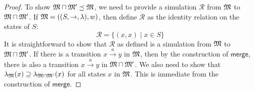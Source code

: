 \begin{proof}
To show $\frak{M} \sqcap \frak{M}' \preceq \frak{M}$, we need to provide a simulation $\mathcal{R}$ from $\frak{M}$ to  $\frak{M} \sqcap \frak{M}'$.
If $\frak{M} = ((S,\rightarrow,\lambda),w)$, then define $\mathcal{R}$ as the identity relation on the states of $S$:
\[
\mathcal{R} = \{(x,x) \; | \; x \in S\}
\]
It is straightforward to show that $\mathcal{R}$ as defined is a simulation from $\frak{M}$ to  $\frak{M} \sqcap \frak{M}'$.
If there is a transition $x \xrightarrow{a} y$ in $\frak{M}$, then by the construction of $\mathsf{merge}$, there is also a transition $x \xrightarrow{a} y$ in $\frak{M} \sqcap \frak{M}'$.
We also need to show that $\lambda_{\frak{M}}(x) \supseteq \lambda_{\frak{M} \sqcap \frak{M}'}(x)$ for all states $x$ in $\frak{M}$. This is immediate from the construction of $\mathsf{merge}$.

\end{proof}

